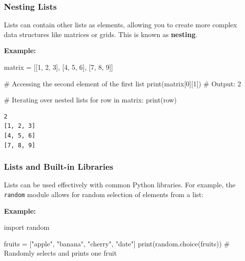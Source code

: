 \documentclass[
  letterpaper,
  DIV=11,
  numbers=noendperiod]{scrreprt}
\newenvironment{Shaded}{\begin{snugshade}}{\end{snugshade}}
\newcommand{\BuiltInTok}[1]{\textcolor[rgb]{0.00,0.23,0.31}{#1}}
\newcommand{\CommentTok}[1]{\textcolor[rgb]{0.37,0.37,0.37}{#1}}
\newcommand{\ControlFlowTok}[1]{\textcolor[rgb]{0.00,0.23,0.31}{#1}}
\newcommand{\DecValTok}[1]{\textcolor[rgb]{0.68,0.00,0.00}{#1}}
\newcommand{\ImportTok}[1]{\textcolor[rgb]{0.00,0.46,0.62}{#1}}
\newcommand{\KeywordTok}[1]{\textcolor[rgb]{0.00,0.23,0.31}{#1}}
\newcommand{\NormalTok}[1]{\textcolor[rgb]{0.00,0.23,0.31}{#1}}
\newcommand{\OperatorTok}[1]{\textcolor[rgb]{0.37,0.37,0.37}{#1}}
\newcommand{\StringTok}[1]{\textcolor[rgb]{0.13,0.47,0.30}{#1}}
\begin{document}
\hypertarget{nesting-lists}{%
\subsubsection{Nesting Lists}\label{nesting-lists}}

Lists can contain other lists as elements, allowing you to create more
complex data structures like matrices or grids. This is known as
\textbf{nesting}.

\textbf{Example:}

\begin{Shaded}
\begin{Highlighting}[]
\NormalTok{matrix }\OperatorTok{=}\NormalTok{ [[}\DecValTok{1}\NormalTok{, }\DecValTok{2}\NormalTok{, }\DecValTok{3}\NormalTok{], [}\DecValTok{4}\NormalTok{, }\DecValTok{5}\NormalTok{, }\DecValTok{6}\NormalTok{], [}\DecValTok{7}\NormalTok{, }\DecValTok{8}\NormalTok{, }\DecValTok{9}\NormalTok{]]}

\CommentTok{\# Accessing the second element of the first list}
\BuiltInTok{print}\NormalTok{(matrix[}\DecValTok{0}\NormalTok{][}\DecValTok{1}\NormalTok{])  }\CommentTok{\# Output: 2}

\CommentTok{\# Iterating over nested lists}
\ControlFlowTok{for}\NormalTok{ row }\KeywordTok{in}\NormalTok{ matrix:}
    \BuiltInTok{print}\NormalTok{(row)}
\end{Highlighting}
\end{Shaded}

\begin{verbatim}
2
[1, 2, 3]
[4, 5, 6]
[7, 8, 9]
\end{verbatim}

\hypertarget{lists-and-built-in-libraries}{%
\subsubsection{Lists and Built-in
Libraries}\label{lists-and-built-in-libraries}}

Lists can be used effectively with common Python libraries. For example,
the \texttt{random} module allows for random selection of elements from
a list:

\textbf{Example:}

\begin{Shaded}
\begin{Highlighting}[]
\ImportTok{import}\NormalTok{ random}

\NormalTok{fruits }\OperatorTok{=}\NormalTok{ [}\StringTok{"apple"}\NormalTok{, }\StringTok{"banana"}\NormalTok{, }\StringTok{"cherry"}\NormalTok{, }\StringTok{"date"}\NormalTok{]}
\BuiltInTok{print}\NormalTok{(random.choice(fruits))  }\CommentTok{\# Randomly selects and prints one fruit}
\end{Highlighting}
\end{Shaded}
\end{document}
